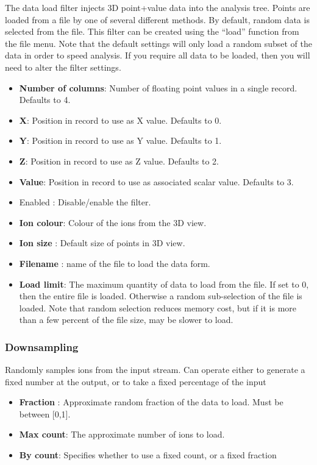 \documentclass[10pt]{article}
\begin{document}
The data load filter injects 3D point+value data into the analysis tree. Points are loaded from a file by one of several different methods. By default, random data is selected from the file. This filter can be created using the ``load'' function from the file menu. Note that the default settings will only load a random subset of the data in order to speed analysis. If you require all data to be loaded, then you will need to alter the filter settings. 
\begin{itemize}
\item  \textbf{Number of columns}: Number of floating point values in a single record. Defaults to 4.
\item  \textbf{X}: Position in record to use as X value. Defaults to 0.
\item  \textbf{Y}: Position in record to use as Y value. Defaults to 1.
\item  \textbf{Z}: Position in record to use as Z value. Defaults to 2.
\item  \textbf{Value}: Position in record to use as associated scalar value. Defaults to 3.
\item Enabled : Disable/enable the filter.


\item  \textbf{Ion colour}: Colour of the ions from the 3D view.
\item  \textbf{Ion size} : Default size of points in 3D view.
\item  \textbf{Filename} : name of the file to load the data form.
\item  \textbf{Load limit}: The maximum quantity of data to load from the file. If set to 0, then the entire file is loaded. Otherwise a random sub-selection of the file is loaded. Note that random selection reduces memory cost, but if it is more than a few percent of the file size, may be slower to load. 

\end{itemize}

\subsubsection{Downsampling}

Randomly samples ions from the input stream. Can operate either to generate a fixed number at the output, or to take a fixed percentage of the input

\begin{itemize}
\item  \textbf{Fraction} : Approximate random fraction of the data to load. Must be between [0,1].
\item  \textbf{Max count}: The approximate number of ions to load.
\item  \textbf{By count}: Specifies whether to use a fixed count, or a fixed fraction

\end{itemize}
 
\end{document}
